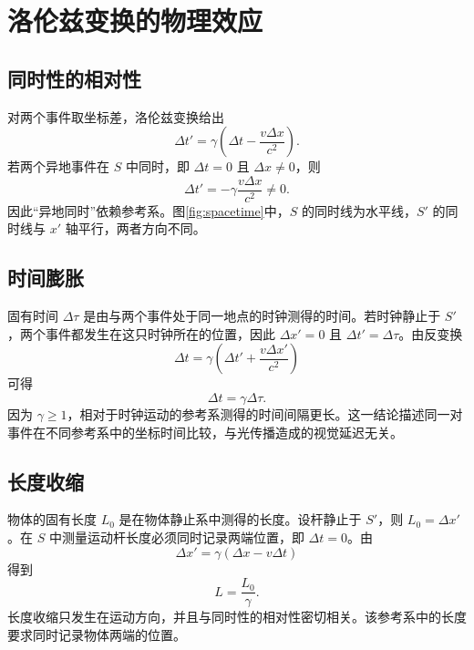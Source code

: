 \documentclass[style=classic,color=full]{lc-article}
\begin{document}
\section{洛伦兹变换的物理效应}

\subsection{同时性的相对性}

对两个事件取坐标差，洛伦兹变换给出
\begin{equation}
  \Delta t'=\gamma\left(\Delta t-\frac{v\Delta x}{c^2}\right).
  \label{eq:relativitysimultaneity}
\end{equation}
若两个异地事件在 $S$ 中同时，即 $\Delta t=0$ 且 $\Delta x\neq0$，则
\begin{equation}
  \Delta t'=-\gamma\frac{v\Delta x}{c^2}\neq0.
\end{equation}
因此“异地同时”依赖参考系。图\ref{fig:spacetime}中，$S$ 的同时线为水平线，$S'$ 的同时线与 $x'$ 轴平行，两者方向不同。


\subsection{时间膨胀}

固有时间 $\Delta\tau$ 是由与两个事件处于同一地点的时钟测得的时间。若时钟静止于 $S'$，两个事件都发生在这只时钟所在的位置，因此 $\Delta x'=0$ 且 $\Delta t'=\Delta\tau$。由反变换
\begin{equation}
  \Delta t=\gamma\left(\Delta t'+\frac{v\Delta x'}{c^2}\right)
\end{equation}
可得
\begin{equation}
  \boxed{\Delta t=\gamma\Delta\tau.}
\end{equation}
因为 $\gamma\ge1$，相对于时钟运动的参考系测得的时间间隔更长。这一结论描述同一对事件在不同参考系中的坐标时间比较，与光传播造成的视觉延迟无关。

\subsection{长度收缩}

物体的固有长度 $L_0$ 是在物体静止系中测得的长度。设杆静止于 $S'$，则 $L_0=\Delta x'$。在 $S$ 中测量运动杆长度必须同时记录两端位置，即 $\Delta t=0$。由
\begin{equation}
  \Delta x'=\gamma(\Delta x-v\Delta t)
\end{equation}
得到
\begin{equation}
  \boxed{L=\frac{L_0}{\gamma}.}
\end{equation}
长度收缩只发生在运动方向，并且与同时性的相对性密切相关。该参考系中的长度要求同时记录物体两端的位置。
\end{document}
